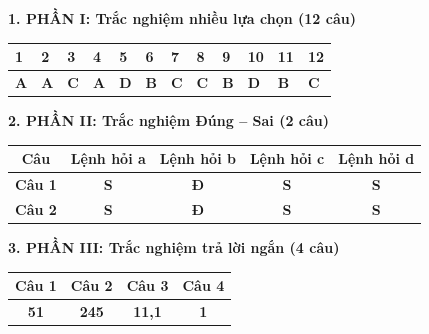 \documentclass[11pt,a4paper]{article}
\begin{document}
\vspace{3pt}
\noindent
\textbf{\color{mainGreen}1. PHẦN I: Trắc nghiệm nhiều lựa chọn (12 câu)}
\begin{center}
\renewcommand{\arraystretch}{1.25}
\begin{tabular}{|*{12}{>{\centering\arraybackslash}p{}|}}
\hline
\textbf{1} & \textbf{2} & \textbf{3} & \textbf{4} & \textbf{5} & \textbf{6} & \textbf{7} & \textbf{8} & \textbf{9} & \textbf{10} & \textbf{11} & \textbf{12} \\
\hline
\textbf{\color{hfRed}A} & \textbf{\color{hfRed}A} & \textbf{\color{hfRed}C} & \textbf{\color{hfRed}A} & \textbf{\color{hfRed}D} & \textbf{\color{hfRed}B} & \textbf{\color{hfRed}C} & \textbf{\color{hfRed}C} & \textbf{\color{hfRed}B} & \textbf{\color{hfRed}D} & \textbf{\color{hfRed}B} & \textbf{\color{hfRed}C} \\
\hline
\end{tabular}
\end{center}

\vspace{3pt}
\noindent
\textbf{\color{mainGreen}2. PHẦN II: Trắc nghiệm Đúng -- Sai (2 câu)}
\begin{center}
\renewcommand{\arraystretch}{1.25}
\begin{tabular}{|c|c|c|c|c|}
\hline
\textbf{Câu} & \textbf{Lệnh hỏi a} & \textbf{Lệnh hỏi b} & \textbf{Lệnh hỏi c} & \textbf{Lệnh hỏi d} \\
\hline
\textbf{Câu 1} & \textbf{\color{hfRed}S} & \textbf{\color{hfRed}Đ} & \textbf{\color{hfRed}S} & \textbf{\color{hfRed}S} \\
\hline
\textbf{Câu 2} & \textbf{\color{hfRed}S} & \textbf{\color{hfRed}Đ} & \textbf{\color{hfRed}S} & \textbf{\color{hfRed}S} \\
\hline
\end{tabular}
\end{center}

\vspace{3pt}
\noindent
\textbf{\color{mainGreen}3. PHẦN III: Trắc nghiệm trả lời ngắn (4 câu)}
\begin{center}
\renewcommand{\arraystretch}{1.25}
\begin{tabular}{|c|c|c|c|}
\hline
\textbf{Câu 1} & \textbf{Câu 2} & \textbf{Câu 3} & \textbf{Câu 4} \\
\hline
\textbf{\color{hfRed}51} & \textbf{\color{hfRed}245} & \textbf{\color{hfRed}11,1} & \textbf{\color{hfRed}1} \\
\hline
\end{tabular}
\end{center}
\end{document}
